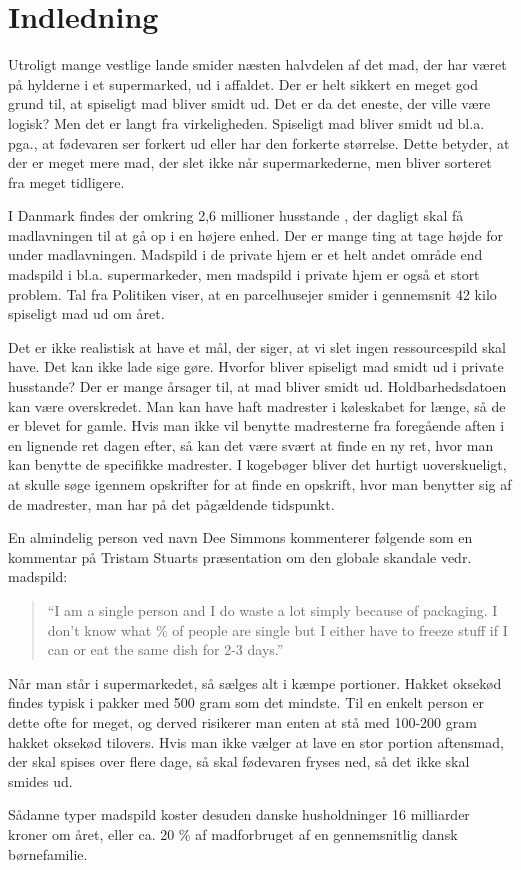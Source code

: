 \section{Indledning}
\label{sec:indledning}

Utroligt mange vestlige lande smider næsten halvdelen af det mad, der har været på hylderne i \fx et supermarked, ud i affaldet. Der er helt sikkert en meget god grund til, at spiseligt mad bliver smidt ud. Det er da det eneste, der ville være logisk? Men det er langt fra virkeligheden. Spiseligt mad bliver smidt ud bl.a. pga., at fødevaren ser forkert ud eller har den forkerte størrelse.\cite{tedmadspild} Dette betyder, at der er meget mere mad, der slet ikke når supermarkederne, men bliver sorteret fra meget tidligere.

I Danmark findes der omkring 2,6 millioner husstande \cite{husstande}, der dagligt skal få madlavningen til at gå op i en højere enhed. Der er mange ting at tage højde for under madlavningen. Madspild i de private hjem er et helt andet område end madspild i bl.a. supermarkeder, men madspild i private hjem er også et stort problem. Tal fra Politiken viser, at en parcelhusejer smider i gennemsnit 42 kilo spiseligt mad ud om året. \cite{madspildpol}

Det er ikke realistisk at have et mål, der siger, at vi slet ingen ressourcespild skal have. Det kan ikke lade sige gøre. \cite{tedmadspild} Hvorfor bliver spiseligt mad smidt ud i private husstande? Der er mange årsager til, at mad bliver smidt ud. Holdbarhedsdatoen kan være overskredet. Man kan have haft madrester i køleskabet for længe, så de er blevet for gamle. Hvis man ikke vil benytte madresterne fra foregående aften i en lignende ret dagen efter, så kan det være svært at finde en ny ret, hvor man kan benytte de specifikke madrester. I kogebøger bliver det hurtigt uoverskueligt, at skulle søge igennem opskrifter for at finde en opskrift, hvor man benytter sig af de madrester, man har på det pågældende tidspunkt.

En almindelig person ved navn Dee Simmons kommenterer følgende\cite{madspildcomment} som en kommentar på Tristam Stuarts præsentation om den globale skandale vedr. madspild:

\begin{quote}
``I am a single person and I do waste a lot simply because of packaging. I don't know what \% of people are single but I either have to freeze stuff if I can or eat the same dish for 2-3 days.''
\end{quote}

Når man står i supermarkedet, så sælges alt i kæmpe portioner. Hakket oksekød findes typisk i pakker med 500 gram som det mindste. Til en enkelt person er dette ofte for meget, og derved risikerer man enten at stå med 100-200 gram hakket oksekød tilovers. Hvis man ikke vælger at lave en stor portion aftensmad, der skal spises over flere dage, så skal fødevaren fryses ned, så det ikke skal smides ud. 

Sådanne typer madspild koster desuden danske husholdninger 16 milliarder kroner om året, eller ca. 20 \% af madforbruget af en gennemsnitlig dansk børnefamilie. \cite{madspild16}
